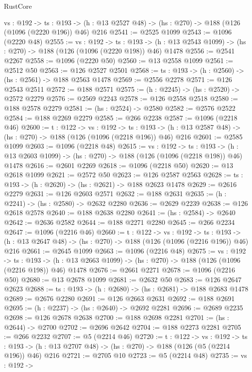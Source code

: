 \begin{lexlean}{RustCore}
\begin{coremodule}
  {vs : @192} ->
  {ts : @193} -> (h : @13 @2527 @48) -> (hs : @270) -> @188 (@126 (@1096 (@2220 @196)) @46) @216
@2541 := @2525 @1099
@2543 := @1096 (@2220 @48)
@2555 := {vs : @192} ->
  {ts : @193} -> (h : @13 @2543 @1099) -> (hs : @270) -> @188 (@126 (@1096 (@2220 @198)) @46) @1478
@2556 := @2541 @2267
@2558 := @1096 (@2220 @50)
@2560 := @13 @2558 @1099
@2561 := @2512 @50
@2563 := @126 @2527 @2501
@2568 := {ts : @193} -> (h : @2560) -> (hs : @2561) -> @188 @2563 @1478
@2569 := @2556 @2278
@2571 := @126 @2543 @2511
@2572 := @188 @2571
@2575 := (h : @2245) -> (hs : @2520) -> @2572 @2279
@2576 := @2569 @2243
@2578 := @126 @2558 @2518
@2580 := @188 @2578 @2279
@2581 := (hs : @2524) -> @2580
@2582 := @2576 @2522
@2584 := @188 @2269 @2279
@2585 := @266 @2238
@2587 := @1096 (@2218 @46)
@2600 := {t : @122} ->
  {vs : @192} ->
  {ts : @193} -> (h : @13 @2587 @48) -> (hs : @270) -> @188 (@126 (@1096 (@2218 @196)) @46) @216
@2601 := @2585 @1099
@2603 := @1096 (@2218 @48)
@2615 := {vs : @192} ->
  {ts : @193} -> (h : @13 @2603 @1099) -> (hs : @270) -> @188 (@126 (@1096 (@2218 @198)) @46) @1478
@2616 := @2601 @2269
@2618 := @1096 (@2218 @50)
@2620 := @13 @2618 @1099
@2621 := @2572 @50
@2623 := @126 @2587 @2563
@2628 := {ts : @193} -> (h : @2620) -> (hs : @2621) -> @188 @2623 @1478
@2629 := @2616 @2279
@2631 := @126 @2603 @2571
@2632 := @188 @2631
@2635 := (h : @2241) -> (hs : @2580) -> @2632 @2280
@2636 := @2629 @2239
@2638 := @126 @2618 @2578
@2640 := @188 @2638 @2280
@2641 := (hs : @2584) -> @2640
@2642 := @2636 @2582
@2644 := @188 @2271 @2280
@2645 := @266 @2234
@2647 := @1096 (@2216 @46)
@2660 := {t : @122} ->
  {vs : @192} ->
  {ts : @193} -> (h : @13 @2647 @48) -> (hs : @270) -> @188 (@126 (@1096 (@2216 @196)) @46) @216
@2661 := @2645 @1099
@2663 := @1096 (@2216 @48)
@2675 := {vs : @192} ->
  {ts : @193} -> (h : @13 @2663 @1099) -> (hs : @270) -> @188 (@126 (@1096 (@2216 @198)) @46) @1478
@2676 := @2661 @2271
@2678 := @1096 (@2216 @50)
@2680 := @13 @2678 @1099
@2681 := @2632 @50
@2683 := @126 @2647 @2623
@2688 := {ts : @193} -> (h : @2680) -> (hs : @2681) -> @188 @2683 @1478
@2689 := @2676 @2280
@2691 := @126 @2663 @2631
@2692 := @188 @2691
@2695 := (h : @2237) -> (hs : @2640) -> @2692 @2281
@2696 := @2689 @2235
@2698 := @126 @2678 @2638
@2700 := @188 @2698 @2281
@2701 := (hs : @2644) -> @2700
@2702 := @2696 @2642
@2704 := @188 @2273 @2281
@2705 := @266 @2232
@2707 := @5 (@2214 @46)
@2720 := {t : @122} ->
  {vs : @192} ->
  {ts : @193} -> (h : @13 @2707 @48) -> (hs : @270) -> @188 (@126 (@5 (@2214 @196)) @46) @216
@2721 := @2705 @10
@2723 := @5 (@2214 @48)
@2735 := {vs : @192} ->

\end{coremodule}
\end{lexlean}
